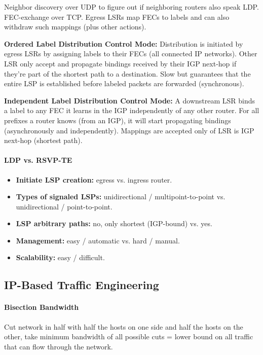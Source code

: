 Neighbor discovery over UDP to figure out if neighboring routers also speak LDP. FEC-exchange over TCP. Egress LSRs map FECs to labels and can also withdraw such mappings (plus other actions).

\textbf{Ordered Label Distribution Control Mode:} Distribution is initiated by egress LSRs by assigning labels to their FECs (all connected IP networks). Other LSR only accept and propagate bindings received by their IGP next-hop if they're part of the shortest path to a destination. Slow but guarantees that the entire LSP is established before labeled packets are forwarded (synchronous).

\textbf{Independent Label Distribution Control Mode:} A downstream LSR binds a label to any FEC it learns in the IGP independently of any other router. For all prefixes a router knows (from an IGP), it will start propagating bindings (asynchronously and independently). Mappings are accepted only of LSR is IGP next-hop (shortest path).

\paragraph{LDP vs. RSVP-TE}
\begin{itemize}
    \item \textbf{Initiate LSP creation:} egress vs. ingress router.
    \item \textbf{Types of signaled LSPs:} unidirectional / multipoint-to-point vs. unidirectional / point-to-point.
    \item \textbf{LSP arbitrary paths:} no, only shortest (IGP-bound) vs. yes.
    \item \textbf{Management:} easy / automatic vs. hard / manual.
    \item \textbf{Scalability:} easy / difficult.
\end{itemize}


\subsection{IP-Based Traffic Engineering}

\paragraph{Bisection Bandwidth}
Cut network in half with half the hosts on one side and half the hosts on the other, take minimum bandwidth of all possible cuts = lower bound on all traffic that can flow through the network.

